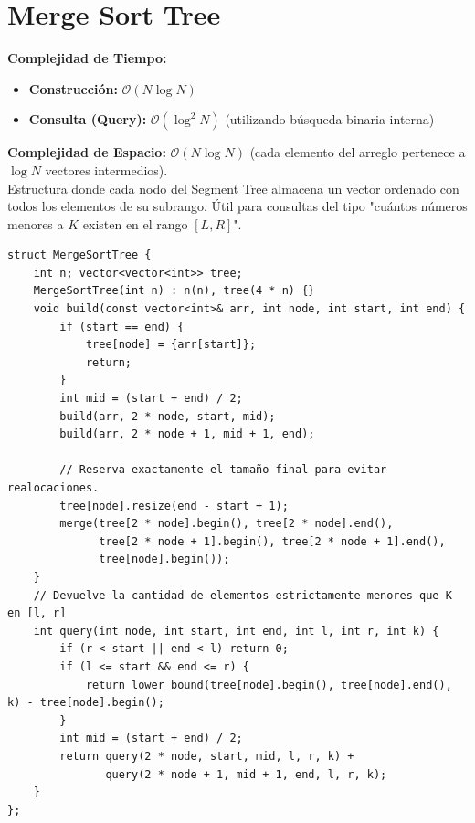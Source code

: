 \documentclass[10pt,twocolumn,letterpaper]{report}
\begin{document}
\section{Merge Sort Tree}
\textbf{Complejidad de Tiempo:}
\begin{itemize}
    \item \textbf{Construcción:} $\mathcal{O}(N \log N)$
    \item \textbf{Consulta (Query):} $\mathcal{O}(\log^2 N)$ (utilizando búsqueda binaria interna)
\end{itemize}
\textbf{Complejidad de Espacio:} $\mathcal{O}(N \log N)$ (cada elemento del arreglo pertenece a $\log N$ vectores intermedios). \\
Estructura donde cada nodo del Segment Tree almacena un vector ordenado con todos los elementos de su subrango. Útil para consultas del tipo "cuántos números menores a $K$ existen en el rango $[L, R]$".
\begin{lstlisting}
struct MergeSortTree {
    int n; vector<vector<int>> tree;
    MergeSortTree(int n) : n(n), tree(4 * n) {}
    void build(const vector<int>& arr, int node, int start, int end) {
        if (start == end) {
            tree[node] = {arr[start]};
            return;
        }
        int mid = (start + end) / 2;
        build(arr, 2 * node, start, mid);
        build(arr, 2 * node + 1, mid + 1, end);
        
        // Reserva exactamente el tamaño final para evitar realocaciones.
        tree[node].resize(end - start + 1);
        merge(tree[2 * node].begin(), tree[2 * node].end(),
              tree[2 * node + 1].begin(), tree[2 * node + 1].end(),
              tree[node].begin());
    }
    // Devuelve la cantidad de elementos estrictamente menores que K en [l, r]
    int query(int node, int start, int end, int l, int r, int k) {
        if (r < start || end < l) return 0;
        if (l <= start && end <= r) {
            return lower_bound(tree[node].begin(), tree[node].end(), k) - tree[node].begin();
        }
        int mid = (start + end) / 2;
        return query(2 * node, start, mid, l, r, k) + 
               query(2 * node + 1, mid + 1, end, l, r, k);
    }
};
\end{lstlisting}
\end{document}
